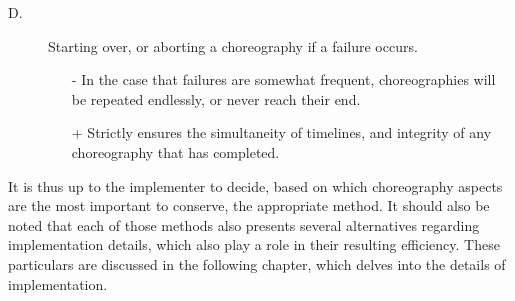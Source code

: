 \begin{description}
\item[D.] Starting over, or aborting a choreography if a failure occurs.

\begin{itemize}
\item[-] In the case that failures are somewhat frequent, choreographies will be repeated endlessly, or never reach their end.
\item[+] Strictly ensures the simultaneity of timelines, and integrity of any choreography that has completed.
\end{itemize}

\end{description}

It is thus up to the implementer to decide, based on which choreography aspects are the most important to conserve, the appropriate method. It should also be noted that each of those methods also presents several alternatives regarding implementation details, which also play a role in their resulting efficiency. These particulars are discussed in the following chapter, which delves into the details of implementation.



